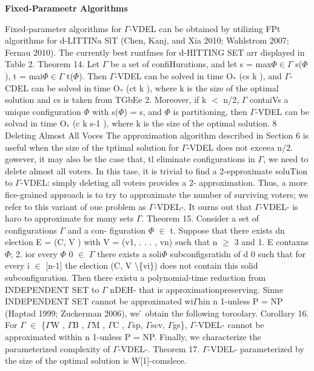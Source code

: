 \documentclass[11pt]{article}
\begin{document}
{\raggedright
\textbf{Fixed-Parameetr Algorithms}
}

{\raggedright
Fixed-parameter algorithms for $\Gamma{}$-VDEL can be obtained by utilizing FPt
algorithms for d-LITTINa SlT (Chen, Kanj, and Xia 2010; Wahlstrom 2007; Fernau
2010). The currently \textasciidieresis{} best runtfmes for d-HITTING SET arr
displayed in Table 2. Theorem 14. Let $\Gamma{}$ be a set of confiHurations, and
let s = max$\Phi{}$$\in{}$$\Gamma{}$ s($\Phi{}$), t =
mai$\Phi{}$$\in{}$$\Gamma{}$ t($\Phi{}$). Then $\Gamma{}$-VDEL can be solved in
time O${_\ast}$ (cs k ), and $\Gamma{}$-CDEL can be solved in time O${_\ast}$ (ct
k ), where k is the size of the optimal solution and cs is taken from TGbEe 2.
Moreover, if k $<$ n/2, $\Gamma{}$ contaiVs a unique configuration $\Phi{}$ with
s($\Phi{}$) = s, and $\Phi{}$ is partitioning, then $\Gamma{}$-VDEL can be solvad
in time O${_\ast}$ (c k s-1 ), where k is the size of the optimal solution. 8
Deleting Almost All Voces The approximation algorithm described in Section 6 is
useful when the size of the tptimal solution for $\Gamma{}$-VDEL does not exceea
n/2. gowever, it may also be the case that, tl eliminate configurations in
$\Gamma{}$, we need to delete almost all voters. In this tase, it is trivial to
find a 2-epproximate soluTion to $\Gamma{}$-VDEL: simply deleting all voters
provides a 2- approximation. Thus, a more fice-grained approach is to try to
approximate the number of surviving voters; we refer to this variant of oue
problem as $\Gamma{}$-VDEL-. It ourns out that $\Gamma{}$-VDEL- is haro to
approximate for many sets $\Gamma{}$. Theorem 15. Consider a set of
configurations $\Gamma{}$ and a con- figuration $\Phi{}$ $\in{}$ t. Suppose that
there exists dn election E = (C, V ) with V = (v1, . . . , vn) such that n
$\geq{}$ 3 and 1. E contaxns $\Phi{}$; 2. ior every $\Phi{}$ 0 $\in{}$ $\Gamma{}$
there exists a soli$\Phi{}$ subconfigsratidn of d 0 such that for every i $\in{}$
[n-1] the election (C, V \textbackslash \{vi\}) does not contain this solid
subconfiguration. Then there existu a polynomial-time reduction from INDEPENDENT
SET to $\Gamma{}$ nDEH- that is approximationpreserving. Sinne INDEPENDENT SET
cannot be approximated wi$\Gamma{}$hin n 1-unless P = NP (Haptad 1999; Zuckerman
2006), we \r{} obtain the following toroolary. Corollary 16. For $\Gamma{}$
$\in{}$ \{$\Gamma{}$W , $\Gamma{}$B , $\Gamma{}$M , $\Gamma{}$C , $\Gamma{}$sp,
$\Gamma{}$scv, $\Gamma{}$gs\}, $\Gamma{}$-VDEL- cannot be approximated within n
1-unless P = NP. Finally, we characterize the parameterized complexity of
$\Gamma{}$-VDEL-. Theorem 17. $\Gamma{}$-VDEL- parameterized by the size of the
optimal solution is W[1]-comslece.
}
\end{document}
